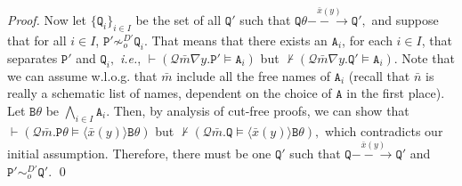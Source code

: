 \documentclass{acmtrans2m}
\newcommand{\ie}{{\em i.e.}}
\def\Qscr{{\mathcal Q}}
\def\Api{{\mathtt A}}
\def\Bpi{{\mathtt B}}
\def\Ppi{{\mathtt P}}
\def\Qpi{{\mathtt Q}}
\newcommand{\one  }[3]{#1\stackrel{#2}{-\!\!-\!\!\!\rightarrow    } #3}
\begin{document}
\begin{proof}
Now let $\{ \Qpi_i \}_{i \in I}$ be the set of all $\Qpi'$ such that
$\one{\Qpi\theta}{\bar x(y)}{\Qpi'},$ and suppose that for all $i \in I$,
$\Ppi' \not \sim_o^{D'} \Qpi_i.$ That means that there exists an 
$\Api_i$, for each $i \in I$, that separates $\Ppi'$ and $\Qpi_i,$
\ie, $\vdash (\Qscr \bar m   \nabla y . \Ppi' \models \Api_i)$ but
$
\not \vdash (\Qscr \bar m \nabla y. \Qpi' \models \Api_i).
$
Note that we can assume w.l.o.g. that $\bar m$ include all the free names
of $\Api_i$ (recall that $\bar n$ is really a schematic list of names,
dependent on the choice of $\Api$ in the first place). 
Let $\Bpi\theta$ be $\bigwedge_{i\in I} \Api_i.$
Then, by analysis of cut-free proofs, we can show that 
$
\vdash (\Qscr \bar m. \Ppi\theta \models \langle \bar x(y) \rangle \Bpi\theta)
$
but
$
\not \vdash (\Qscr \bar m. \Qpi \models \langle \bar x(y) \rangle \Bpi\theta),
$
which contradicts our initial assumption.
Therefore, there must be one $\Qpi'$ such that
$\one{\Qpi}{\bar x(y)}{\Qpi'}$ and $\Ppi' \sim_o^{D'} \Qpi'.$
\qed
\end{proof}
\end{document}
